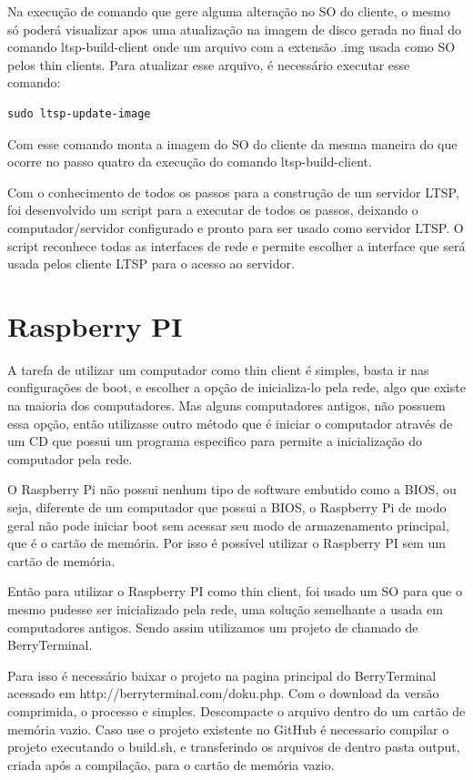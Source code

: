 \documentclass[
	12pt,				%
	openright,			%
	twoside,			%
	a4paper,			%
	chapter=TITLE,		%
	english,			%
	brazil				%
	]{abntex2}
\begin{document}
Na execução de comando que gere alguma alteração no SO do cliente, o mesmo só poderá visualizar apos uma atualização na imagem de disco gerada no final do comando ltsp-build-client onde um arquivo com a extensão .img usada como  SO pelos thin clients. Para atualizar esse arquivo, é necessário executar esse comando:

\begin{verbatim}
sudo ltsp-update-image
\end{verbatim}

Com esse comando monta a imagem do SO do cliente da mesma maneira do que ocorre no passo quatro da execução do comando  ltsp-build-client.

Com o conhecimento de todos os passos para a construção de um servidor LTSP, foi desenvolvido um script para a executar de todos os passos, deixando o computador/servidor configurado e pronto para ser usado como servidor LTSP. O script reconhece todas as interfaces de rede e permite escolher a interface que será usada pelos cliente LTSP para o acesso ao servidor.

\chapter{Raspberry PI}

A tarefa de utilizar um computador como thin client é simples, basta ir nas configurações de boot, e escolher a opção de inicializa-lo pela rede, algo que existe na maioria dos computadores. Mas alguns computadores antigos, não possuem essa opção,  então utilizasse outro método  que é iniciar o computador através de um CD que possui um programa especifico para permite a inicialização do computador pela rede.

O Raspberry Pi não possui nenhum tipo de software embutido como a BIOS, ou seja, diferente de um computador que possui a BIOS, o Raspberry Pi de modo geral não pode iniciar boot sem acessar seu modo de armazenamento principal, que é o cartão de memória. Por isso é possível utilizar o Raspberry PI sem um cartão de memória.

	Então para utilizar o Raspberry PI como thin client, foi usado um SO para que o mesmo pudesse ser inicializado pela rede, uma solução semelhante a usada em computadores antigos. Sendo assim utilizamos um projeto de chamado de BerryTerminal. 
	
Para isso é necessário baixar o projeto na pagina principal do BerryTerminal  acessado em http://berryterminal.com/doku.php.	 Com o download da versão comprimida, o processo e simples. Descompacte o arquivo dentro do um cartão de memória vazio. Caso use o projeto existente no GitHub é necessario compilar o projeto executando o build.sh, e transferindo os arquivos de dentro pasta output, criada após a compilação, para o cartão de memória vazio.
\end{document}
